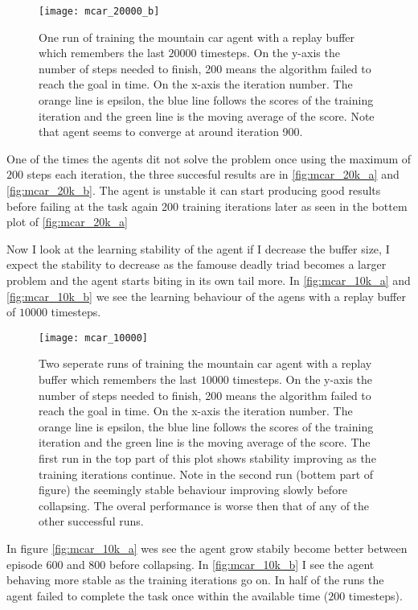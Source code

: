\begin{figure}
    \texttt{[image: mcar\_20000\_b]}
    \caption{One run of training the mountain car agent with a replay buffer which remembers the last $20000$ timesteps. On the y-axis the number of steps needed to finish, 200 means the algorithm failed to reach the goal in time. On the x-axis the iteration number. The orange line is epsilon, the blue line follows the scores of the training iteration and the green line is the moving average of the score. Note that agent seems to converge at around iteration 900.}
    \label{fig:mcar_20k_b}
\end{figure}

One of the times the agents dit not solve the problem once using the maximum of $200$ steps each iteration, the three succesful results are in \autoref{fig:mcar_20k_a} and \autoref{fig:mcar_20k_b}. The agent is unstable it can start producing good results before failing at the task again 200 training iterations later as seen in the bottem plot of \autoref{fig:mcar_20k_a}

Now I look at the learning stability of the agent if I decrease the buffer size, I expect the stability to decrease as the famouse deadly triad becomes a larger problem and the agent starts biting in its own tail more. In \autoref{fig:mcar_10k_a} and \autoref{fig:mcar_10k_b} we see the learning behaviour of the agens with a replay buffer of $10 000$ timesteps.

\begin{figure}
    \texttt{[image: mcar\_10000]}
    \caption{Two seperate runs of training the mountain car agent with a replay buffer which remembers the last $10000$ timesteps. On the y-axis the number of steps needed to finish, 200 means the algorithm failed to reach the goal in time. On the x-axis the iteration number. The orange line is epsilon, the blue line follows the scores of the training iteration and the green line is the moving average of the score. The first run in the top part of this plot shows stability improving as the training iterations continue. Note in the second run (bottem part of figure) the seemingly stable behaviour improving slowly   before collapsing. The overal performance is worse then that of any of the other successful runs.}
    \label{fig:mcar_10k_a}
\end{figure}

In figure \autoref{fig:mcar_10k_a} wes see the agent grow stabily become better between episode 600 and 800 before collapsing. In \autoref{fig:mcar_10k_b} I see the agent behaving more stable as the training iterations go on. In half of the runs the agent failed to complete the task once within the available time ($200$ timesteps).

